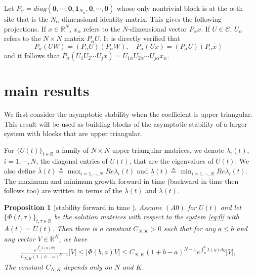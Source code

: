 \documentclass[a4paper,11pt]{article}
\newcommand{\upl}{\overline{\lambda}}
\newcommand{\udl}{\underline{\lambda}}
\newcommand{\C}{\mathcal{C}}
\newcounter{Theorem}
\newtheorem{proposition}[Theorem]{Proposition}
\theoremstyle{remark}
\begin{document}
Let $P_\alpha=diag(\mathbf{0},\cdots,\mathbf{0},\mathbf{1}_{N_\alpha},\mathbf{0},\cdots,\mathbf{0})$ whose only nontrivial block is at the $\alpha$-th site that is the $N_\alpha$-dimensional identity matrix. This gives the following projections. If $x\in \mathbb{R}^N$, $x_\alpha$ refers to the $N$-dimensional vector $P_\alpha x$. If $U\in \C$, $U_\alpha$ refers to the $N\times N$ matrix $P_\alpha U$. It is directly verified that 
$$P_\alpha (UW) = (P_\alpha U) (P_\alpha W), \quad P_\alpha (U x) = (P_\alpha U) (P_\alpha x)$$
and it follows that $P_\alpha(U_1U_2\cdots U_j x) = U_{1\alpha}U_{2\alpha}\cdots U_{j\alpha} x_\alpha.$


\section{main results}

We first consider the asymptotic stability when the coefficient is upper triangular. This result will be used as building blocks of the asymptotic stability of a larger system with blocks that are upper triangular. 

For $\{U(t)\}_{t\in \mathbb{R}}$  a family of $N\times N$ upper triangular matrices, we denote $\lambda_i(t)$, $i=1,\cdots,N$, the diagonal entries of $U(t)$, that are the eigenvalues of $U(t)$. We also define $\displaystyle\upl(t)\triangleq \max_{i=1,\cdots,N} Re \lambda_i(t)$ and $\displaystyle \udl(t)\triangleq \min_{i=1,\cdots,N} Re \lambda_i(t)$. The maximum and minimum growth forward in time (backward in time then follows too) are written in terms of the $\upl(t)$ and $\udl(t)$. 

\begin{proposition}[stability forward in time \cite{L19}] \label{stability} Assume $(A0)$ for $U(t)$ and let $\{\Phi(t,\tau)\}_{t,\tau \in \mathbb{R}}$ be the solution matrices with respect to the system \eqref{eq:0} with $A(t)=U(t)$. Then there is a constant $C_{N,K}>0$ such that for any $a \le b$ and any vector $V \in \mathbb{R}^N$, we have
\begin{equation} \label{stabestim}
 \begin{aligned}
 \frac{e^{\int_a^b \udl(\eta) d\eta}}{C_{N,K}(1+b-a)^{N-1}}|V| \le |\Phi(b,a)V|
 \le C_{N,K}(1+b-a)^{N-1}e^{\int_a^b \upl(\eta) d\eta}|V|,  
 \end{aligned}
\end{equation}
The constant $C_{N,K}$ depends only on $N$ and $K$. 
\end{proposition}
\end{document}
